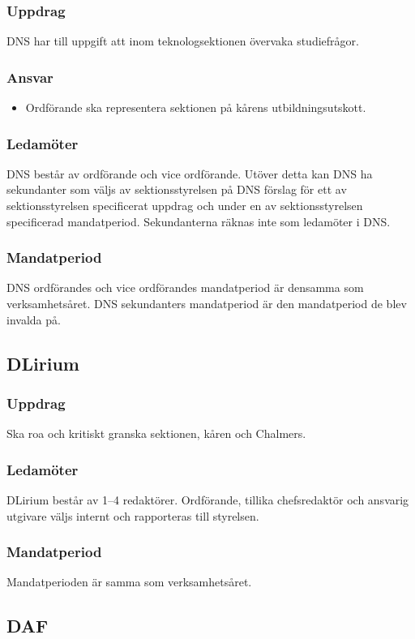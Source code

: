 \subsubsection{Uppdrag}
DNS har till uppgift att inom teknologsektionen övervaka studiefrågor.
\subsubsection{Ansvar}
\begin{itemize}
  \item Ordförande ska representera sektionen på kårens utbildningsutskott.
\end{itemize}
\subsubsection{Ledamöter}
DNS består av ordförande och vice ordförande. Utöver detta kan DNS ha sekundanter som väljs av sektionsstyrelsen på DNS förslag för ett av sektionsstyrelsen specificerat uppdrag och under en av sektionsstyrelsen specificerad mandatperiod. Sekundanterna räknas inte som ledamöter i DNS.
\subsubsection{Mandatperiod}
DNS ordförandes och vice ordförandes mandatperiod är densamma som verksamhetsåret. DNS sekundanters mandatperiod är den mandatperiod de blev invalda på.

\subsection{DLirium}
\subsubsection{Uppdrag}
Ska roa och kritiskt granska sektionen, kåren och Chalmers. 
\subsubsection{Ledamöter}
DLirium består av 1--4 redaktörer. Ordförande, tillika chefsredaktör och ansvarig utgivare väljs internt och rapporteras till styrelsen.
\subsubsection{Mandatperiod}
Mandatperioden är samma som verksamhetsåret. 

\subsection{DAF}
